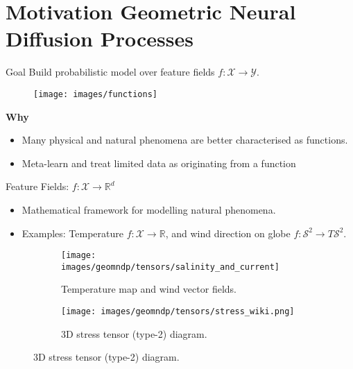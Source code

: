 \section{Motivation Geometric Neural Diffusion Processes}

\begin{frame}{Goal}
{Build probabilistic model over feature fields $f: \mathcal{X} \rightarrow \mathcal{Y}$.}
\begin{figure}
\texttt{[image: images/functions]}
\end{figure}
\pause
\vspace{-5mm}
\textbf{Why}
\begin{itemize}
    \item Many physical and natural phenomena are better characterised as functions.
    \item Meta-learn and treat limited data as originating from a function
\end{itemize}
\end{frame}

\begin{frame}{Feature Fields: $f: \mathcal{X} \rightarrow \mathbb{R}^d$}

\begin{itemize}
    \item Mathematical framework for modelling natural phenomena.
    \item Examples: Temperature $f:\mathcal{X}\rightarrow\mathbb{R}$,
    and wind direction on globe $f:\mathcal{S}^2\rightarrow T\mathcal{S}^2$.
\end{itemize}

    \begin{figure}
        \centering
        \begin{subfigure}{0.45\textwidth}
            \centering
            \texttt{[image: images/geomndp/tensors/salinity\_and\_current]}
            \caption{Temperature map and wind vector fields.}
        \end{subfigure}
        \hfill
        \begin{subfigure}{0.45\textwidth}
            \centering
            \texttt{[image: images/geomndp/tensors/stress\_wiki.png]}
            \caption{3D stress tensor (type-2) diagram.}
        \end{subfigure}
    \end{figure}
\end{frame}


